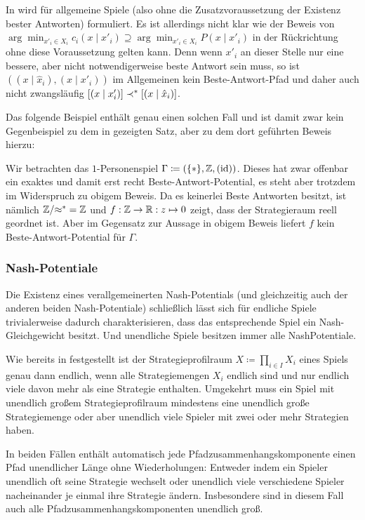 In \cite{BestRespPot} wird  für allgemeine Spiele (also ohne die Zusatzvoraussetzung der Existenz bester Antworten) formuliert. Es ist allerdings nicht klar wie der Beweis von $\arg \min_{x'_i \in X_i}c_i(x \mid x'_i) \supseteq \arg \min_{x'_i \in X_i} P(x \mid x'_i)$ in der Rückrichtung ohne diese Voraussetzung gelten kann. Denn wenn $x'_i$ an dieser Stelle nur eine bessere, aber nicht notwendigerweise beste Antwort sein muss, so ist $((x \mid \hat{x}_i), (x \mid x'_i))$ im Allgemeinen kein Beste-Antwort-Pfad und daher auch nicht zwangsläufig $[(x \mid x'_i)] \prec^\ast [(x \mid \hat{x}_i)]$.

Das folgende Beispiel enthält genau einen solchen Fall und ist damit zwar kein Gegenbeispiel zu dem in \cite{BestRespPot} gezeigten Satz, aber zu dem dort geführten Beweis hierzu:

\begin{bsp}
	Wir betrachten das $1$-Personenspiel $\Gamma \coloneqq (\{\ast\}, \mathbb{Z}, (\mathrm{id}))$. Dieses hat zwar offenbar ein exaktes und damit erst recht Beste-Antwort-Potential, es steht aber trotzdem im Widerspruch zu obigem Beweis. Da es keinerlei Beste Antworten besitzt, ist nämlich $\mathbb{Z}/{\approx^\ast} = \mathbb{Z}$ und $f: \mathbb{Z} \to \mathbb{R}: z \mapsto 0$ zeigt, dass der Strategieraum reell geordnet ist. Aber im Gegensatz zur Aussage in obigem Beweis liefert $f$ kein Beste-Antwort-Potential für $\Gamma$.
\end{bsp}


\subsubsection{Nash-Potentiale}

Die Existenz eines verallgemeinerten Nash-Potentials (und gleichzeitig auch der anderen beiden Nash-Potentiale) schließlich lässt sich für endliche Spiele trivialerweise dadurch charakterisieren, dass das entsprechende Spiel ein Nash-Gleichgewicht besitzt. Und unendliche Spiele besitzen immer alle NashPotentiale.

\begin{beob}
	Wie bereits in  festgestellt ist der Strategieprofilraum $X \coloneqq \prod_{i \in I}X_i$ eines Spiels genau dann endlich, wenn alle Strategiemengen $X_i$ endlich sind und nur endlich viele davon mehr als eine Strategie enthalten. Umgekehrt muss ein Spiel mit unendlich großem Strategieprofilraum mindestens eine unendlich große Strategiemenge oder aber unendlich viele Spieler mit zwei oder mehr Strategien haben.
	
	In beiden Fällen enthält automatisch jede Pfadzusammenhangskomponente einen Pfad unendlicher Länge ohne Wiederholungen: Entweder indem ein Spieler unendlich oft seine Strategie wechselt oder unendlich viele verschiedene Spieler nacheinander je einmal ihre Strategie ändern. Insbesondere sind in diesem Fall auch alle Pfadzusammenhangskomponenten unendlich groß.
\end{beob}

